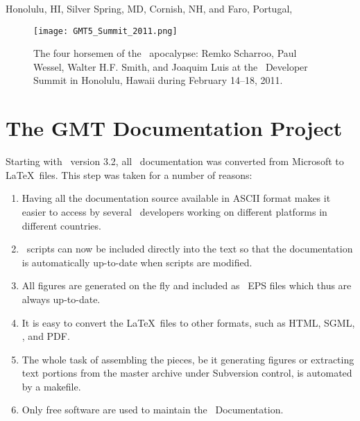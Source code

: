 \begin{flushright}
Honolulu, HI, Silver Spring, MD, Cornish, NH, and Faro, Portugal, \GMTDOCDATE
\end{flushright}

\noindent
\begin{figure}[H]
	\centering
	\texttt{[image: GMT5\_Summit\_2011.png]}
	\caption{The four horsemen of the \GMT\ apocalypse: Remko Scharroo, Paul Wessel,
	Walter H.F. Smith, and Joaquim Luis at the \GMT\ Developer Summit in Honolulu,
	Hawaii during February 14--18, 2011.}
\end{figure}


\chapter*{The GMT Documentation Project}

Starting with \GMT\ version 3.2, all \GMT\ documentation was
converted from Microsoft  to \LaTeX\ files.
This step was taken for a number of reasons:

\begin{enumerate}

\item Having all the documentation source available in
ASCII format makes it easier to access by several
\GMT\ developers working on different platforms in 
different countries.

\item \GMT\ scripts can now be included directly into the text
so that the documentation is automatically up-to-date
when scripts are modified.

\item All figures are generated on the fly and included as
\GMT\ EPS files which thus are always up-to-date.

\item It is easy to convert the \LaTeX\ files to other
formats, such as HTML, SGML, \PS, and PDF.

\item The whole task of assembling the pieces, be it generating
figures or extracting text portions from the master archive under
Subversion control, is automated by a makefile.

\item Only free software are used to maintain the \GMT\ Documentation.

\end{enumerate}

